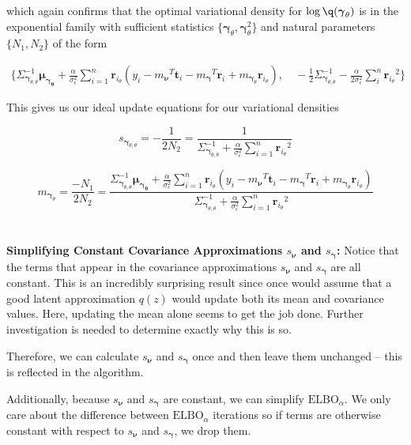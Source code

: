 \documentclass[letterpaper,12pt]{article}
\newcommand{\lp}{\left (} %
\newcommand{\rp}{\right )} %
\newcommand{\sigmaepsilon}{\sigma_\epsilon^2} %
\newcommand{\rvec}[1]{\ensuremath{\boldsymbol{r}_{#1}}} %
\newcommand{\nuv}{\boldsymbol{\nu}} %
\newcommand{\gammav}{\boldsymbol{\gamma}} %
\newcommand{\ti}{\boldsymbol{t}_i} %
\newcommand{\ri}{\boldsymbol{r}_i} %
\newcommand{\mnu}{\ensuremath{m_\nuv}} %
\newcommand{\mgamma}{m_\gammav} %
\newcommand{\meangammatheta}{\ensuremath{\boldsymbol{\mu_{\gammav_\theta}}}} %
\newcommand{\mgammasub}[1]{\ensuremath{m_{\gammav_#1}}} %
\newcommand{\elbo}{\ensuremath{\mathrm{ELBO}}}
\begin{document}
which again confirms that the optimal variational density for $\log \q(\gammav_\theta)$ is in the exponential family with sufficient statistics $\{ \gammav_\theta,\gammav_\theta^2\}$ and natural parameters $\{N_1,N_2\}$ of the form

\begin{equation}
\begin{split}
    \Bigg\{ \Sigma_{\gammav_{\theta, \theta}}^{-1} \meangammatheta + \frac{\alpha}{ \sigmaepsilon} \sum_{i=1}^n \rvec{i_\theta} \lp y_i - {\mnu}^T \ti - {\mgamma}^T \ri + \mgammasub{\theta} \rvec{i_\theta} \rp, \quad - \frac{1}{2} \Sigma_{\gammav_{\theta, \theta}}^{-1} - \frac{\alpha}{2 \sigmaepsilon} \sum_i^n \rvec{i_\theta}^2 \Bigg\}
\end{split}
\end{equation}

This gives us our ideal update equations for our variational densities

\begin{equation}
    s_{\gammav_{\theta, \theta}} = -\frac{1}{2 N_2}= \frac{1}{\Sigma_{\gammav_{\theta, \theta}}^{-1} + \frac{\alpha}{ \sigmaepsilon} \sum_{i=1}^n \rvec{i_\theta}^2 }
\end{equation}

\begin{equation}
    \mgammasub{\theta} = \frac{-N_1}{2N_2} = \frac{\Sigma_{\gammav_{\theta, \theta}}^{-1} \meangammatheta + \frac{\alpha}{ \sigmaepsilon} \sum_{i=1}^n \rvec{i_\theta} \lp y_i - {\mnu}^T \ti - {\mgamma}^T \ri + \mgammasub{\theta} \rvec{i_\theta} \rp}{\Sigma_{\gammav_{\theta, \theta}}^{-1} + \frac{\alpha}{ \sigmaepsilon} \sum_{i=1}^n \rvec{i_\theta}^2 }
\end{equation}
\\ \\
\noindent \textbf{Simplifying Constant Covariance Approximations $s_\nuv$ and $s_\gammav$:} Notice that the terms that appear in the covariance approximations $s_\nuv$ and $s_\gammav$ are all constant. This is an incredibly surprising result since once would assume that a good latent approximation $q(z)$ would update both its mean and covariance values. Here, updating the mean alone seems to get the job done. Further investigation is needed to determine exactly why this is so.

Therefore, we can calculate $s_\nuv$ and $s_\gammav$ once and then leave them unchanged -- this is reflected in the algorithm.

Additionally, because $s_\nuv$ and $s_\gammav$ are constant, we can simplify  $\elbo_\alpha$. We only care about the difference between $\elbo_\alpha$ iterations so if terms are otherwise constant with respect to $s_\nuv$ and $s_\gammav$, we drop them.
\end{document}
